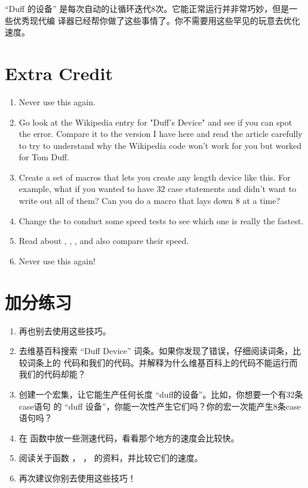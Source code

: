 “Duff 的设备” 是每次自动的让循环迭代8次。它能正常运行并非常巧妙，但是一些优秀现代编
译器已经帮你做了这些事情了。你不需要用这些罕见的玩意去优化速度。


\section{Extra Credit}

\begin{enumerate}
\item Never use this again.

\item Go look at the Wikipedia entry for "Duff's Device" and see if you can
    spot the error.  Compare it to the version I have here and read the article
    carefully to try to understand why the Wikipedia code won't work for you
    but worked for Tom Duff.

\item Create a set of macros that lets you create any length device like this.
    For example, what if you wanted to have 32 case statements and didn't want
    to write out all of them? Can you do a macro that lays down 8 at a time?

\item Change the  to conduct some speed tests to see which one is
    really the fastest.

\item Read about , , , and also compare
    their speed.

\item Never use this again!
\end{enumerate}

\section{加分练习}
\begin{enumerate}
\item 再也别去使用这些技巧。

\item 去维基百科搜索 “Duff Device” 词条。如果你发现了错误，仔细阅读词条，比较词条上的
	代码和我们的代码。并解释为什么维基百科上的代码不能运行而我们的代码却能？

\item 创建一个宏集，让它能生产任何长度 “duff的设备”。比如，你想要一个有32条case语句
	的 “duff 设备”，你能一次性产生它们吗？你的宏一次能产生8条case语句吗？

\item 在  函数中放一些测速代码，看看那个地方的速度会比较快。

\item 阅读关于函数 ， ，  的资料，并比较它们的速度。

\item 再次建议你别去使用这些技巧！
\end{enumerate}
